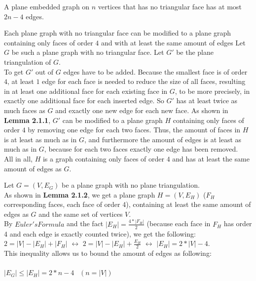 \documentclass[a4paper]{article}
\begin{document}
\begin{solution}{19}
\begin{theorem} {A plane embedded graph on $n$ vertices that has no triangular face has at most $2n-4$ edges.}
			\begin{lemma} {Each plane graph with no triangular face can be modified to a plane graph containing only faces of order $4$  and with at least the same amount of edges}
				Let $G$ be such a plane graph with no triangular face. Let $G'$ be the plane triangulation of $G$.\\
				To get $G'$ out of $G$ edges have to be added. Because the smallest face is of order $4$, at least $1$ edge for each face is needed to reduce the size of all faces, resulting in at least one additional face for each existing face in $G$, to be more precisely, in exactly one additional face for each inserted edge. So $G'$ has at least twice as much faces as $G$ and exactly one new edge for each new face. As shown in \textbf{Lemma 2.1.1}, $G'$ can be modified to a plane graph $H$ containing only faces of order $4$ by removing one edge for each two faces. Thus, the amount of faces in $H$ is at least as much as in $G$, and furthermore the amount of edges is at least as much as in $G$, because for each two faces exactly one edge has been removed.\\
				All in all, $H$ is a graph containing only faces of order $4$ and has at least the same amount of edges as $G$.
			\end{lemma}		
			
	
			Let $G=(V,E_G)$ be a plane graph with no plane triangulation.\\
			As shown in \textbf{Lemma 2.1.2}, we get a plane graph $H=(V,E_H)$ ($F_H$ corresponding faces, each face of order 4), containing at least the same amount of edges as $G$ and the same set of vertices $V$.\\
			
			By $Euler's Formula$ and the fact $|E_H|= \frac{4 * |F_H|}{2}$ (because each face in $F_H$ has order 4 and each edge is exactly counted twice), we get the following:\\
			$2 = |V| - |E_H| +|F_H|$ $\leftrightarrow$ $2 = |V| - |E_H| + \frac{E_H}{2}$ $\leftrightarrow$ $|E_H| = 2 * |V| - 4$.\\
			This inequality allows us to bound the amount of edges as following:\\\\
			$|E_G| \leq |E_H| = 2 * n - 4$   $~~(n=|V|)$
			
		\end{theorem}
	\end{solution}
	\newpage
\end{document}

